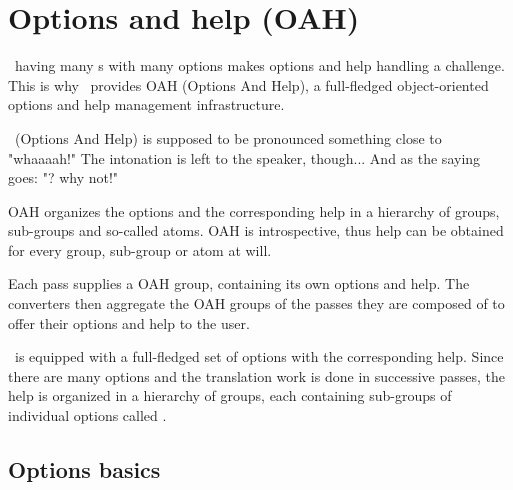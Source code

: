 



\chapter{Options and help (OAH)}

\mf\ having many \service s with many options makes options and help handling a challenge.\\
This is why \mf\ provides OAH (Options And Help), a full-fledged object-oriented options and help management infrastructure.

\oahRepr\ (Options And Help) is supposed to be pronounced something close to "whaaaah!"
    The intonation is left to the speaker, though...
    And as the saying goes: "\oahRepr? why not!"

OAH organizes the options and the corresponding help in a hierarchy of groups, sub-groups and so-called atoms. OAH is introspective, thus help can be obtained for every group, sub-group or atom at will.

Each pass supplies a OAH group, containing its own options and help. The converters then aggregate the OAH groups of the passes they are composed of to offer their options and help to the user.

\mf\ is equipped with a full-fledged set of options with the corresponding help. Since there are many options and the translation work is done in successive passes, the help is organized in a hierarchy of groups, each containing sub-groups of individual options called .


\section{Options basics}

